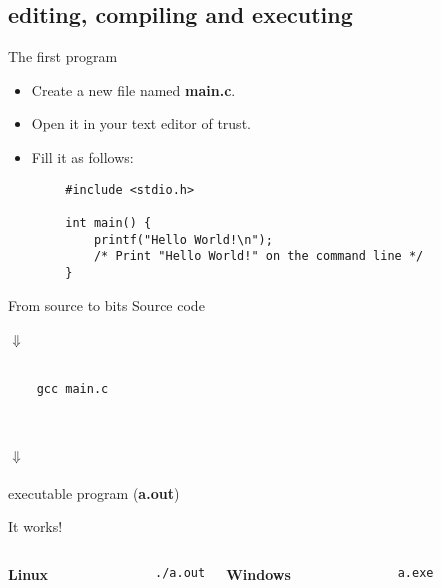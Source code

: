 \subsection{editing, compiling and executing}
\begin{frame}[fragile]{The first program}
	\begin{itemize}
		\item Create a new file named \textbf{main.c}.
		\item Open it in your text editor of trust.
		\item Fill it as follows:
	\end{itemize}
	\begin{lstlisting}
		#include <stdio.h>
		
		int main() {
		    printf("Hello World!\n");
		    /* Print "Hello World!" on the command line */
		}
	\end{lstlisting}
\end{frame}
\begin{frame}[fragile]{From source to bits}
	\centering
	Source code\\\ \\
	$\Downarrow$\\\ \\
	\begin{lstlisting}
	gcc main.c
	\end{lstlisting}
	\ \\\ \\
	$\Downarrow$\\\ \\
	executable program (\textbf{a.out})\\
\end{frame}
\begin{frame}[fragile]{It works!}
	\begin{columns}[T]
		\textbf{Linux}\\
		\begin{lstlisting}
			./a.out
		\end{lstlisting}
		\textbf{Windows}\\
		\begin{lstlisting}
			a.exe
		\end{lstlisting}
	\end{columns}
\end{frame}

